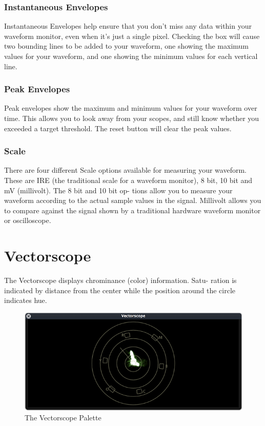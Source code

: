 \documentclass[10,letterpaper,]{report}
\begin{document}
\subsection{Instantaneous Envelopes}

Instantaneous Envelopes help ensure that you don't miss any data within
your waveform monitor, even when it's just a single pixel. Checking the
box will cause two bounding lines to be added to your waveform, one
showing the maximum values for your waveform, and one showing the
minimum values for each vertical line.

\subsection{Peak Envelopes}

Peak envelopes show the maximum and minimum values for your waveform
over time. This allows you to look away from your scopes, and still know
whether you exceeded a target threshold. The reset button will clear the
peak values.

\subsection{Scale}

There are four different Scale options available for measuring your
waveform. These are IRE (the traditional scale for a waveform monitor),
8 bit, 10 bit and mV (millivolt). The 8 bit and 10 bit op- tions allow
you to measure your waveform according to the actual sample values in
the signal. Millivolt allows you to compare against the signal shown by
a traditional hardware waveform monitor or oscilloscope.

\chapter{Vectorscope}

The Vectorscope displays chrominance (color) information. Satu- ration
is indicated by distance from the center while the position around the
circle indicates hue.

\begin{figure}[htbp]
\centering
\includegraphics{images/vectorscope.png}
\caption{The Vectorscope Palette}
\end{figure}
\end{document}
